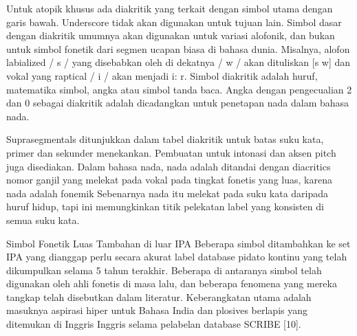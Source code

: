 	Untuk atopik khusus ada diakritik yang terkait dengan simbol utama dengan garis bawah.
	Underscore tidak akan digunakan untuk tujuan lain. Simbol dasar dengan diakritik umumnya akan digunakan untuk variasi alofonik, dan bukan untuk simbol fonetik dari segmen ucapan biasa di bahasa dunia. Misalnya, alofon labialized / s / yang disebabkan oleh di dekatnya / w / akan dituliskan [s w] dan vokal yang raptical / i / akan menjadi i: r. Simbol diakritik adalah huruf, matematika simbol, angka atau simbol tanda baca. Angka dengan pengecualian 2 dan 0 sebagai diakritik adalah dicadangkan untuk penetapan nada dalam bahasa nada.

	Suprasegmentals ditunjukkan dalam tabel diakritik untuk batas suku kata, primer dan sekunder
    menekankan. Pembuatan untuk intonasi dan aksen pitch juga disediakan. Dalam bahasa nada, nada adalah
    ditandai dengan diacritics nomor ganjil yang melekat pada vokal pada tingkat fonetis yang luas, karena nada
    adalah fonemik Sebenarnya nada itu melekat pada suku kata daripada huruf hidup, tapi ini
    memungkinkan titik pelekatan label yang konsisten di semua suku kata.

	Simbol Fonetik Luas Tambahan di luar IPA 
	Beberapa simbol ditambahkan ke set IPA yang dianggap perlu secara akurat
	label database pidato kontinu yang telah dikumpulkan selama 5 tahun terakhir. Beberapa di antaranya
	simbol telah digunakan oleh ahli fonetis di masa lalu, dan beberapa fenomena yang mereka tangkap
	telah disebutkan dalam literatur. Keberangkatan utama adalah masuknya aspirasi hiper untuk
	Bahasa India dan plosives berlapis yang ditemukan di Inggris Inggris selama pelabelan
	database SCRIBE [10]. 

